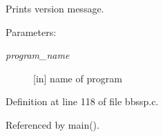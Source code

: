 Prints version message. 

\begin{Desc}
\item[Parameters:]
\begin{description}
\item[{\em program\_\-name}]\mbox{[}in\mbox{]} name of program \end{description}
\end{Desc}


Definition at line 118 of file bbssp.c.

Referenced by main().